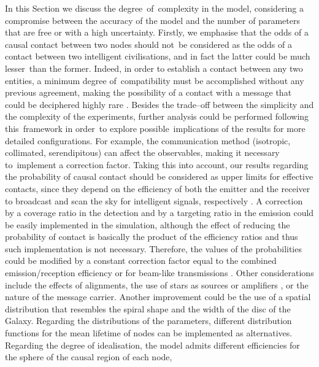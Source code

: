 \documentclass[crop]{CSLB}
\newcommand{\ceti}{node}
\newcommand{\cetis}{nodes}
\begin{document}
In this Section we discuss the degree of complexity in the model,
considering a compromise between the accuracy of the model and the
number of parameters that are free or with a high uncertainty.
%
Firstly, we emphasise that the odds of a causal contact between two
nodes should not be considered as the odds of a contact between two
intelligent civilisations, and in fact the latter could be much
lesser than the former.
%
Indeed, in order to establish a contact between any two entities, a
minimum degree of compatibility must be accomplished without any
previous agreement, making the possibility of a contact with a message
that could be deciphered highly rare \citep[see e.g.
][]{forgan_collimated_2014}.
%
Besides the trade--off between the simplicity and the complexity of
the experiments, further analysis could be performed following
this framework in order to explore possible implications of the
results for more detailed configurations.
%
For example, the communication method (isotropic, collimated,
serendipitous) can affect the observables, making it necessary
to implement a correction factor.
%
Taking this into account, our results regarding the probability of
causal contact should be considered as upper limits for effective
contacts, since they depend on the efficiency of both the emitter and
the receiver to broadcast and scan the sky for intelligent signals,
respectively \citep{grimaldi_signal_2017}.
%
A correction by a coverage ratio in the detection and by a targeting
ratio in the emission could be easily implemented in the simulation,
although the effect of reducing the probability of contact is
basically the product of the efficiency ratios and thus such
implementation is not necessary.
%
Therefore, the values of the probabilities could be modified by a
constant correction factor equal to the combined emission/reception
efficiency \citep{smith_broadcasting_2009, anchordoqui_upper_2019,
forgan_collimated_2014} or for beam-like transmissions
\citep{grimaldi_signal_2017}. 
%
Other considerations include the effects of alignments, the use of
stars as sources or amplifiers \citep{Edmondson2003,
borra_searching_2012}, or the nature of the message carrier.
%
Another improvement could be the use of a spatial distribution that
resembles the spiral shape and the width of the disc of the Galaxy.
%
Regarding the distributions of the parameters, different distribution
functions for the mean lifetime of \cetis{} can be implemented as
alternatives.
%
Regarding the degree of idealisation, the model admits different
efficiencies for the sphere of the causal region of each \ceti{},
\end{document}
